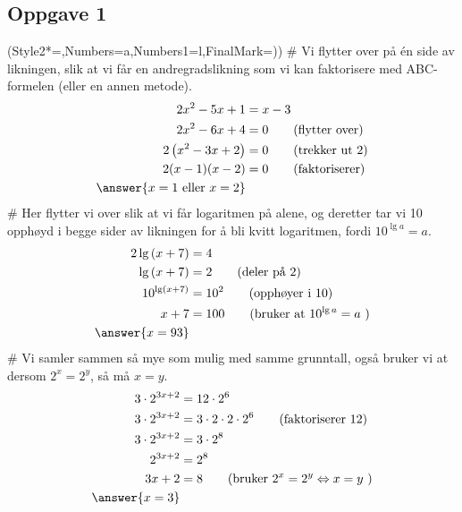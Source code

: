 \subsection*{Oppgave 1}
\begin{easylist}[enumerate]
\ListProperties(Style2*=,Numbers=a,Numbers1=l,FinalMark={)})
# Vi flytter over på én side av likningen, slik at vi får en andregradslikning som vi kan faktorisere med ABC-formelen (eller en annen metode).
\begin{align*}
	2x^2 - 5x + 1 &= x - 3 \\
	2x^2 - 6x + 4 &= 0 \qquad \text{(flytter over)}\\
	2 \left( x^2 - 3x + 2 \right) &= 0 \qquad \text{(trekker ut 2)} \\
	2 (x-1)(x-2) &= 0 \qquad \text{(faktoriserer)}\\
	\answer{x = 1 \text{ eller } x = 2} &	
\end{align*}
# Her flytter vi over slik at vi får logaritmen på alene, og deretter tar vi 10 opphøyd i begge sider av likningen for å bli kvitt logaritmen, fordi $10^{\lg a} = a$.
\begin{align*}
	2 \lg \left(x + 7\right) &= 4 \\
	\lg \left(x + 7\right) &= 2  \qquad \text{(deler på 2)}\\
	10^{\lg \left(x + 7\right)} &= 10^2  \qquad \text{(opphøyer i 10)}\\
	x + 7 &= 100 \qquad \text{(bruker at } 10^{\lg a} = a \text{ )} \\
	\answer{x = 93}
\end{align*}
# Vi samler sammen så mye som mulig med samme grunntall, også bruker vi at dersom $2^x = 2^y$, så må $x=y$.
\begin{align*}
	3 \cdot 2^{3x+ 2} &= 12 \cdot 2^6 \\
	3 \cdot 2^{3x+ 2} &= 3 \cdot 2 \cdot 2 \cdot 2^6 \qquad \text{(faktoriserer 12)} \\
	3 \cdot 2^{3x+ 2} &= 3 \cdot 2^8 \\
	 2^{3x+ 2} &= 2^8 \\
	  {3x+ 2} &= 8 \qquad \text{(bruker } 2^x = 2^y \Leftrightarrow x = y \text{ )} \\
	  \answer{x = 3}
\end{align*}
\end{easylist}

